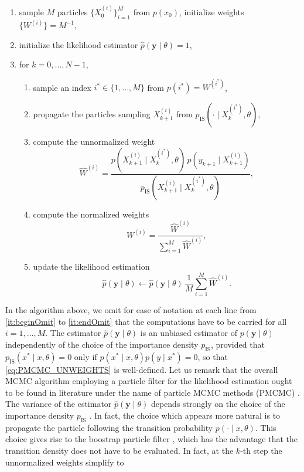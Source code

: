 \documentclass[10pt]{article}
\begin{document}
\begin{enumerate}[label=\textit{\roman*})]
	\item sample $M$ particles $\{X^{(i)}_0\}_{i=1}^M$ from $p(x_0)$, initialize weights $\{W^{(i)}\} = M^{-1}$,
	\item initialize the likelihood estimator $\hat p(\mathbf y \mid \theta) = 1$,
	\item\label{it:extFor} for $k = 0, \ldots, N-1$,
	\begin{enumerate}[label=\ref{it:extFor}.\arabic*)]
		\item\label{it:beginOmit} sample an index $i^* \in \{1, \ldots, M\}$ from $p(i^*) = W^{(i^*)}$,
		\item propagate the particles sampling $X^{(i)}_{k+1}$ from $p_{\mathrm{IS}}(\cdot \mid X_k^{(i^*)}, \theta)$,
		\item compute the unnormalized weight
		\begin{equation}\label{eq:PMCMC_UNWEIGHTS}
			\widehat W^{(i)} = \frac{p(X^{(i)}_{k+1} \mid X^{(i^*)}_k, \theta)\,p(y_{k+1} \mid X^{(i)}_{k+1})}{p_{\mathrm{IS}}(X^{(i)}_{k+1} \mid X^{(i^*)}_k, \theta)},
		\end{equation}
		\item\label{it:endOmit} compute the normalized weights
		\begin{equation}
			W^{(i)} = \frac{\widehat W^{(i)}}{\sum_{i=1}^M \widehat W^{(i)}},
		\end{equation}
		\item update the likelihood estimation 
		\begin{equation}
			\hat p(\mathbf y \mid \theta) \leftarrow \hat p(\mathbf y \mid \theta) \, \frac{1}{M} \sum_{i=1}^{M} \widehat W^{(i)}.
		\end{equation}
	\end{enumerate}
\end{enumerate}
In the algorithm above, we omit for ease of notation at each line from \ref{it:beginOmit} to \ref{it:endOmit} that the computations have to be carried for all $i = 1, \ldots, M$. The estimator $\hat p(\mathbf y \mid \theta)$ is an unbiased estimator of $p(\mathbf y \mid \theta)$ independently of the choice of the importance density $p_{\mathrm{IS}}$, provided that $p_{\mathrm{IS}}(x^* \mid x, \theta) = 0$ only if $p(x^* \mid x, \theta)p(y \mid x^*) = 0$, so that \eqref{eq:PMCMC_UNWEIGHTS} is well-defined. Let us remark that the overall MCMC algorithm employing a particle filter for the likelihood estimation ought to be found in literature under the name of particle MCMC methods (PMCMC) \cite{ADH10}. The variance of the estimator $\hat p(\mathbf y \mid \theta)$ depends strongly on the choice of the importance density $p_{\mathrm{IS}}$ \cite{ADH10, GoW11}. In fact, the choice which appears more natural is to propagate the particle following the transition probability $p(\cdot \mid x, \theta)$. This choice gives rise to the boostrap particle filter \cite{GSS93}, which has the advantage that the transition density does not have to be evaluated. In fact, at the $k$-th step the unnormalized weights simplify to 
\end{document}
